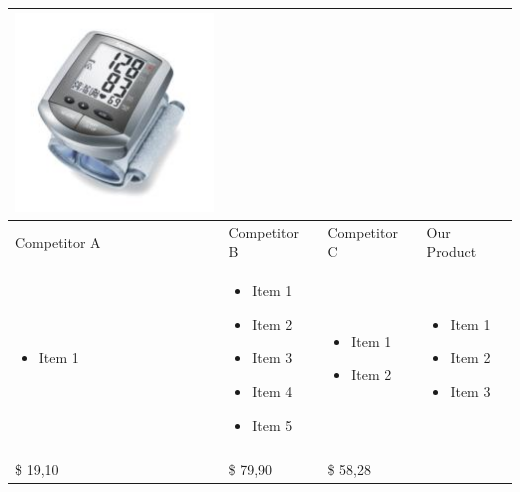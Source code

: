 \documentclass[11pt,a4paper,titlepage]{article}
\begin{document}
\begin{tabular}{| m{92 pt} | m{92 pt} | m{92 pt} | m{92 pt} |}
  \includegraphics[scale=0.40,bb=0 0 150 150]{prod_bpm4.jpg} \\ \hline
  Competitor A & Competitor B & Competitor C & Our Product\\ \hline
  \begin{itemize} \tiny \item Item 1 \end{itemize} & 
  \begin{itemize} \tiny 
  \item Item 1
  \item Item 2
  \item Item 3
  \item Item 4
  \item Item 5\end{itemize} & 
    \begin{itemize} \tiny 
    \item Item 1
    \item Item 2\end{itemize}& 
      \begin{itemize} \tiny 
      \item Item 1
      \item Item 2
      \item Item 3 \end{itemize} \\
      & & & \\ \hline
      \$ 19,10 & \$ 79,90 & \$ 58,28 & \\ \hline
\end{tabular}
\end{document}
